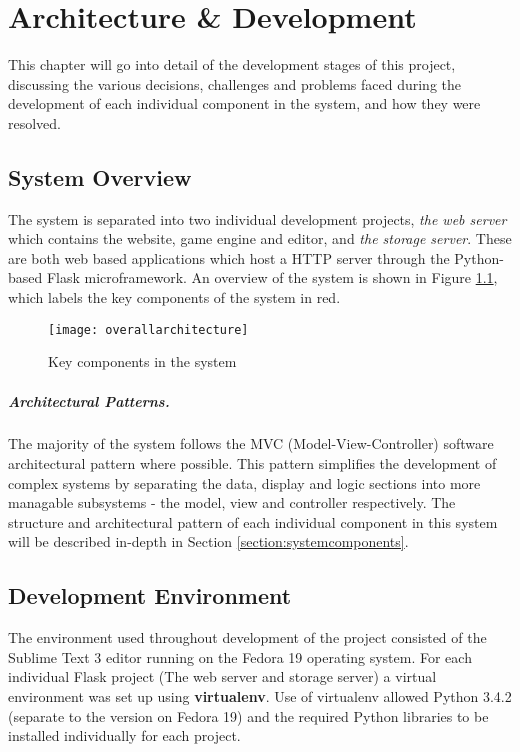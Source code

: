 \chapter{Architecture \& Development}
This chapter will go into detail of the development stages of this project, discussing the various decisions, challenges and problems faced during the development of each individual component in the system, and how they were resolved.

\section{System Overview}
The system is separated into two individual development projects, \emph{the web server} which contains the website, game engine and editor, and \emph{the storage server}. These are both web based applications which host a HTTP server through the Python-based Flask microframework. An overview of the system is shown in Figure \ref{fig:overallarchitecture}, which labels the key components of the system in red.

\begin{figure}[h]
	\centering
	\texttt{[image: overallarchitecture]}
	\caption{Key components in the system}
	\label{fig:overallarchitecture}
\end{figure}

\paragraph{Architectural Patterns.}
The majority of the system follows the MVC (Model-View-Controller) software architectural pattern where possible. This pattern simplifies the development of complex systems by separating the data, display and logic sections into more managable subsystems - the model, view and controller respectively. The structure and architectural pattern of each individual component in this system will be described in-depth in Section \ref{section:systemcomponents}.


\section{Development Environment}
The environment used throughout development of the project consisted of the Sublime Text 3 editor running on the Fedora 19 operating system. For each individual Flask project (The web server and storage server) a virtual environment was set up using \textbf{virtualenv}. Use of virtualenv allowed Python 3.4.2 (separate to the version on Fedora 19) and the required Python libraries to be installed individually for each project.


